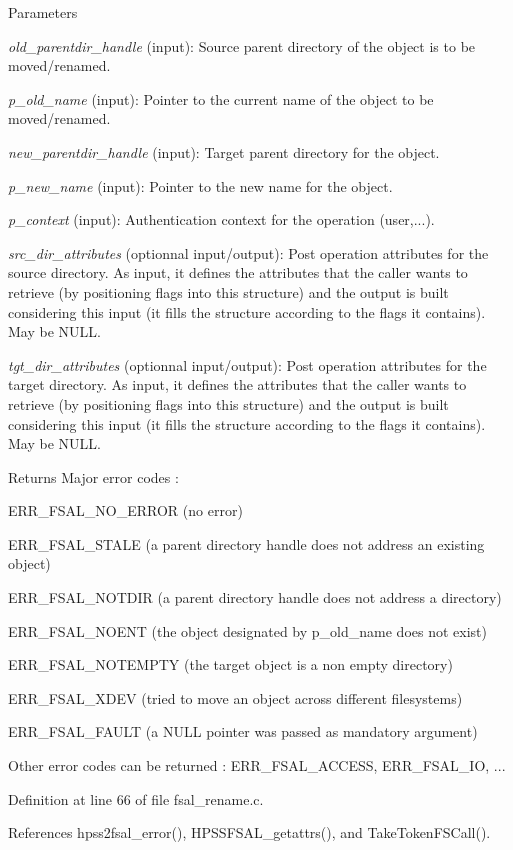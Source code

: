 \begin{DoxyParams}{Parameters}
\item[{\em old\_\-parentdir\_\-handle}](input): Source parent directory of the object is to be moved/renamed. \item[{\em p\_\-old\_\-name}](input): Pointer to the current name of the object to be moved/renamed. \item[{\em new\_\-parentdir\_\-handle}](input): Target parent directory for the object. \item[{\em p\_\-new\_\-name}](input): Pointer to the new name for the object. \item[{\em p\_\-context}](input): Authentication context for the operation (user,...). \item[{\em src\_\-dir\_\-attributes}](optionnal input/output): Post operation attributes for the source directory. As input, it defines the attributes that the caller wants to retrieve (by positioning flags into this structure) and the output is built considering this input (it fills the structure according to the flags it contains). May be NULL. \item[{\em tgt\_\-dir\_\-attributes}](optionnal input/output): Post operation attributes for the target directory. As input, it defines the attributes that the caller wants to retrieve (by positioning flags into this structure) and the output is built considering this input (it fills the structure according to the flags it contains). May be NULL.\end{DoxyParams}
\begin{DoxyReturn}{Returns}
Major error codes :
\begin{DoxyItemize}
\item ERR\_\-FSAL\_\-NO\_\-ERROR (no error)
\item ERR\_\-FSAL\_\-STALE (a parent directory handle does not address an existing object)
\item ERR\_\-FSAL\_\-NOTDIR (a parent directory handle does not address a directory)
\item ERR\_\-FSAL\_\-NOENT (the object designated by p\_\-old\_\-name does not exist)
\item ERR\_\-FSAL\_\-NOTEMPTY (the target object is a non empty directory)
\item ERR\_\-FSAL\_\-XDEV (tried to move an object across different filesystems)
\item ERR\_\-FSAL\_\-FAULT (a NULL pointer was passed as mandatory argument)
\item Other error codes can be returned : ERR\_\-FSAL\_\-ACCESS, ERR\_\-FSAL\_\-IO, ... 
\end{DoxyItemize}
\end{DoxyReturn}


Definition at line 66 of file fsal\_\-rename.c.

References hpss2fsal\_\-error(), HPSSFSAL\_\-getattrs(), and TakeTokenFSCall().